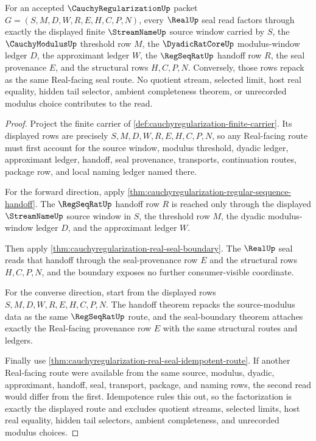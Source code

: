\begin{theorem}
\label{thm:cauchyregularization-real-seal-source-modulus-factorization}
For an accepted $\CauchyRegularizationUp$ packet
$G=(S,M,D,W,R,E,H,C,P,N)$, every $\RealUp$ seal read factors through exactly
the displayed finite $\StreamNameUp$ source window carried by $S$, the
$\CauchyModulusUp$ threshold row $M$, the $\DyadicRatCoreUp$
modulus-window ledger $D$, the approximant ledger $W$, the $\RegSeqRatUp$
handoff row $R$, the seal provenance $E$, and the structural rows
$H,C,P,N$. Conversely, those rows repack as the same Real-facing seal route.
No quotient stream, selected limit, host real equality, hidden tail selector,
ambient completeness theorem, or unrecorded modulus choice contributes to the
read.
\end{theorem}
\begin{proof}
Project the finite carrier of
\autoref{def:cauchyregularization-finite-carrier}. Its displayed rows are
precisely $S,M,D,W,R,E,H,C,P,N$, so any Real-facing route must first account
for the source window, modulus threshold, dyadic ledger, approximant ledger,
handoff, seal provenance, transports, continuation routes, package row, and
local naming ledger named there.

For the forward direction, apply
\autoref{thm:cauchyregularization-regular-sequence-handoff}. The
$\RegSeqRatUp$ handoff row $R$ is reached only through the displayed
$\StreamNameUp$ source window in $S$, the threshold row $M$, the dyadic
modulus-window ledger $D$, and the approximant ledger $W$.

Then apply \autoref{thm:cauchyregularization-real-seal-boundary}. The
$\RealUp$ seal reads that handoff through the seal-provenance row $E$ and the
structural rows $H,C,P,N$, and the boundary exposes no further
consumer-visible coordinate.

For the converse direction, start from the displayed rows
$S,M,D,W,R,E,H,C,P,N$. The handoff theorem repacks the source-modulus data as
the same $\RegSeqRatUp$ route, and the seal-boundary theorem attaches exactly
the Real-facing provenance row $E$ with the same structural routes and
ledgers.

Finally use \autoref{thm:cauchyregularization-real-seal-idempotent-route}.
If another Real-facing route were available from the same source,
modulus, dyadic, approximant, handoff, seal, transport, package, and naming
rows, the second read would differ from the first. Idempotence rules this out,
so the factorization is exactly the displayed route and excludes quotient
streams, selected limits, host real equality, hidden tail selectors, ambient
completeness, and unrecorded modulus choices.
\end{proof}

